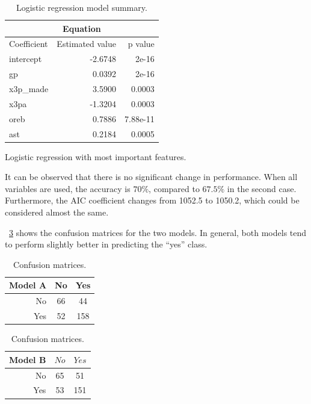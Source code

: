 \begin{table}[H]
	\hfill
	\begin{subtable}[h]{0.4\textwidth}
		\centering
		\begin{tabular}{|| l | r | r ||} 
			\hline
			\multicolumn{3}{|c|}{Equation} \\
			\hline
			Coefficient & Estimated value & p value \\
			\hline
			intercept & -2.6748 & 2e-16 \\
			gp & 0.0392 & 2e-16 \\
			x3p\_made & 3.5900 & 0.0003 \\
			x3pa & -1.3204 & 0.0003 \\
			oreb & 0.7886 & 7.88e-11 \\		
			ast & 0.2184 & 0.0005 \\
			\hline
		\end{tabular}
		\caption{Logistic regression with most important features.}
		\label{table:LRImpSum}
	\end{subtable}
	\caption{Logistic regression model summary.}
	\label{table:LRSum}
\end{table}

It can be observed that there is no significant change in performance. When all variables are used, the accuracy is $70\%$, compared to $67.5\%$ in the second case. Furthermore, the AIC coefficient changes from 1052.5 to 1050.2, which could be considered almost the same. 

\Tab~\ref{table:ConfMat} shows the confusion matrices for the two models. In general, both models tend to perform slightly better in predicting the ``yes'' class.

\begin{table}[H]
	\begin{subtable}[h]{0.4\textwidth}
		\centering
		\begin{tabular}{|| cr | cc ||}    
			\hline
			\multicolumn{2}{|c|}{Model A} 
			& No & Yes \\
			\hline
			& No & 66 & 44 \\
			& Yes & 52 & 158 \\
			\hline
		\end{tabular}
		\caption{}
		\label{table:ConfMatModA}
	\end{subtable}
	\hfill
	\begin{subtable}[h]{0.4\textwidth}
		\centering
		\begin{tabular}{|| cr | cc ||}    
			\hline
			\multicolumn{2}{|c|}{Model B} 
			& $No$ & $Yes$ \\
			\hline
			& No & 65 & 51 \\
			& Yes & 53 & 151 \\
			\hline
		\end{tabular}
		\caption{}
		\label{table:ConfMatModA}
	\end{subtable}
	\caption{Confusion matrices.}
	\label{table:ConfMat}
\end{table}

